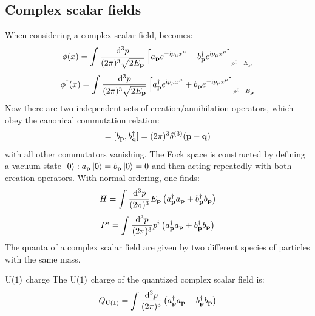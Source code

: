 \subsection{Complex scalar fields}

When considering a complex scalar field,  becomes:
\begin{equation}
  \phi(x) = \int \frac{\mathrm{d}^3p}{(2\pi)^3 \sqrt{2E_{\mathbf{p}}}} \left[ a_{\mathbf{p}} e^{-\mathrm{i} p_\mu x^\mu} + b_{\mathbf{p}}^\dagger e^{\mathrm{i} p_\mu x^\mu} \right]_{p^0 = E_{\mathbf{p}}}
\end{equation}
\begin{equation}
  \phi^\dagger(x) = \int \frac{\mathrm{d}^3p}{(2\pi)^3 \sqrt{2E_{\mathbf{p}}}} \left[ a_{\mathbf{p}}^\dagger e^{\mathrm{i} p_\mu x^\mu} + b_{\mathbf{p}} e^{-\mathrm{i} p_\mu x^\mu} \right]_{p^0 = E_{\mathbf{p}}}
\end{equation}
Now there are two independent sets of creation/annihilation operators, which obey the canonical commutation relation:
\begin{equation}
  [a_\ve{p} , a_\ve{q}^\dagger] = [b_\ve{p} , b_\ve{q}^\dagger] = (2\pi)^3 \delta^{(3)}(\ve{p} - \ve{q})
\end{equation}
with all other commutators vanishing. The Fock space is constructed by defining a vacuum state $ \ket{0} : a_{\mathbf{p}} \ket{0} = b_{\mathbf{p}} \ket{0} = 0 $ and then acting repeatedly with both creation operators. With normal ordering, one finds:
\begin{equation}
  H = \int \frac{\mathrm{d}^3p}{(2\pi)^3} E_{\mathbf{p}} \left( a_{\mathbf{p}}^\dagger a_{\mathbf{p}} + b_{\mathbf{p}}^\dagger b_{\mathbf{p}} \right)
\end{equation}
\begin{equation}
  P^i = \int \frac{\mathrm{d}^3p}{(2\pi)^3} p^i \left( a_{\mathbf{p}}^\dagger a_{\mathbf{p}} + b_{\mathbf{p}}^\dagger b_{\mathbf{p}} \right)
\end{equation}
The quanta of a complex scalar field are given by two different species of particles with the same mass.

\begin{proposition}{$ \mathrm{U}(1) $ charge}{}
  The $ \mathrm{U}(1) $ charge of the quantized complex scalar field is:
  \begin{equation}
    Q_{\mathrm{U}(1)} = \int \frac{\mathrm{d}^3p}{(2\pi)^3} \left( a_{\mathbf{p}}^\dagger a_{\mathbf{p}} - b_{\mathbf{p}}^\dagger b_{\mathbf{p}} \right)
  \end{equation}
\end{proposition}

